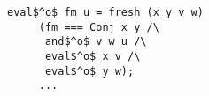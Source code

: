 \begin{figure}[!t]
  \centering
  \begin{minipage}{0.75\textwidth}
    \begin{lstlisting}[frame=tb]
 eval$^o$ fm u = fresh (x y v w)
     (fm === Conj x y /\ 
      and$^o$ v w u /\ 
      eval$^o$ x v /\ 
      eval$^o$ y w);
     ...
    \end{lstlisting}
  \end{minipage}
\end{figure}
